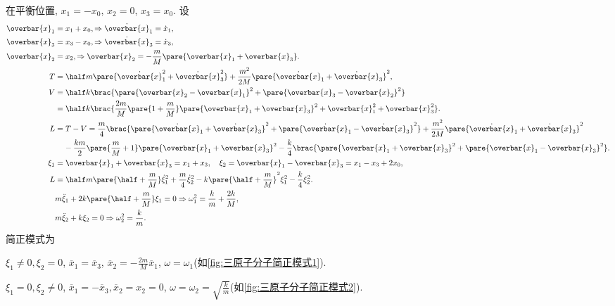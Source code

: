 \documentclass[../LectureNotes.tex]{subfiles}
\begin{document}
\begin{sample}
\begin{ex}[三原子分子振动]
        在平衡位置, $x_1 = -x_0$, $x_2=  0$, $x_3 = x_0$. 设
        \begin{align*}
            \overbar{x}_1 &= x_1 + x_0, \Rightarrow \dot{\overbar{x}}_1 = \dot{x}_1, \\
            \overbar{x}_3 &= x_3 - x_0, \Rightarrow \dot{\overbar{x}}_3 = \dot{x}_3, \\
            \overbar{x}_2 &= x_2, \Rightarrow \overbar{x}_2 = -\frac{m}{M}\pare{\overbar{x}_1 + \overbar{x}_3}. \\
            T&= \half m \pare{\dot{\overbar{x}}_1^2 + \dot{\overbar{x}}_3^2} + \frac{m^2}{2M}\pare{\dot{\overbar{x}}_1 + \dot{\overbar{x}}_3}^2, \\
            V&= \half k \brac{\pare{\overbar{x}_2 - \overbar{x}_1}^2 + \pare{\overbar{x}_3 - \overbar{x}_2}^2} \\
            &= \half k \brac{\frac{2m}{M}\pare{1+\frac{m}{M}} \pare{\overbar{x}_1 + \overbar{x}_3}^2 + \overbar{x}_1^2 + \overbar{x}_3^2}. \\
            L &= T-V = \frac{m}{4} \brac{\pare{\dot{\overbar{x}}_1 + \dot{\overbar{x}}_3}^2 + \pare{\dot{\overbar{x}}_1 - \dot{\overbar{x}}_3}^2} + \frac{m^2}{2M}\pare{\dot{\overbar{x}}_1 + \dot{\overbar{x}}_3}^2 \\
            &\phantom{=}\ -\frac{km}{2}\pare{\frac{m}{M}+1}\pare{\overbar{x}_1 + \overbar{x}_3}^2 - \frac{k}{4}\brac{\pare{\overbar{x}_1 + \overbar{x}_3}^2 + \pare{\overbar{x}_1 - \overbar{x}_3}^2}. \\
            \xi_1 &= \overbar{x}_1 + \overbar{x}_3 = x_1 + x_3,\quad \xi_2 = \overbar{x}_1 - \overbar{x}_3 = x_1 - x_3 + 2x_0, \\
            L &= \half m\pare{\half + \frac{m}{M}}\dot{\xi}_1^2 + \frac{m}{4} \dot{\xi}_2^2 - k\pare{\half + \frac{m}{M}}^2 \xi_1^2 - \frac{k}{4}\xi_2^2. \\
            & m\ddot{\xi}_1 + 2k\pare{\half + \frac{m}{M}} \xi_1 = 0\Rightarrow \omega_1^2 = \frac{k}{m} + \frac{2k}{M}, \\
            & m\ddot{\xi}_2 + k\xi_2 = 0 \Rightarrow \omega_2^2 = \frac{k}{m}.
        \end{align*}
        简正模式为
        \begin{cenum}
            \item $\xi_1 \neq 0, \xi_2 = 0$, $\overbar{x}_1 = \overbar{x}_3$, $\displaystyle \overbar{x}_2 = -\frac{2m}{M}\overbar{x}_1$, $\omega = \omega_1$(如\cref{fig:三原子分子简正模式1}).
            \item $\xi_1 = 0, \xi_2\neq 0$, $\overbar{x}_1 = -\overbar{x}_3, \overbar{x}_2 = x_2 = 0$, $\displaystyle \omega = \omega_2 = \sqrt{\frac{k}{m}}$(如\cref{fig:三原子分子简正模式2}).
        \end{cenum}
    \end{ex}
\end{sample}
\end{document}
